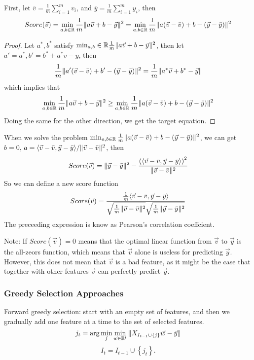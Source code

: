 First, let $ \bar v = \frac{1}{m} \sum^{m}_{i=1} v_i $, and $ \bar y = \frac{1}{m} \sum^{m}_{i=1} y_i $, then
\[
    Score(\vec{v}) = \min_{a, b \in \mathbb{R}} \frac{1}{m} \Arrowvert a \vec{v} + b - \vec{y} \Arrowvert^2 
    = \min_{a, b \in \mathbb{R}} \frac{1}{m} \Arrowvert a (\vec{v} - \bar v) + b - (\vec{y} - \bar y) \Arrowvert^2 
\]
\begin{proof}
    Let $ a^*, b^* $ satisfy $ \min_{a, b}\in\mathbb{R} \frac{1}{m} \Arrowvert a \vec{v} + b - \vec{y} \Arrowvert^2 $,
    then let $ a' = a^*, b' = b^* + a^* \bar v - \bar y $, then
    \[
        \frac{1}{m} \Arrowvert a'(\vec{v} - \bar v) + b' - (\vec{y} - \bar y) \Arrowvert^2 = \frac{1}{m} \Arrowvert a^* \vec{v} + b^* - \vec{y} \Arrowvert
    \]
    which implies that 
    \[
        \min_{a, b \in \mathbb{R}} \frac{1}{m} \Arrowvert a \vec{v} + b - \vec{y} \Arrowvert^2 
        \ge \min_{a, b \in \mathbb{R}} \frac{1}{m} \Arrowvert a (\vec{v} - \bar v) + b - (\vec{y} - \bar y) \Arrowvert^2 
    \]
    Doing the same for the other direction, we get the target equation.
\end{proof}
When we solve the problem $ \min_{a, b \in \mathbb{R}} \frac{1}{m} \Arrowvert a (\vec{v} - \bar v) + b - (\vec{y} - \bar y) \Arrowvert^2  $, we can get $ b = 0 $, $ a = \langle \vec{v} - \bar v, \vec{y} - \bar y \rangle/ \Arrowvert \vec{v} - \bar v \Arrowvert^2 $, then
\[
    Score(\vec{v}) = \Arrowvert \vec{y} - \bar y \Arrowvert^2 - \frac{{(\langle \vec{v} - \bar v, \vec{y} - \bar y \rangle)}^2}{ \Arrowvert \vec{v} - \bar v \Arrowvert^2} 
\]
So we can define a new score function
\[
    Score(\vec{v}) = \frac{\frac{1}{m} \langle \vec{v} - \bar v, \vec{y} - \bar y \rangle}{ \sqrt{\frac{1}{m} \Arrowvert \vec{v} - \bar v \Arrowvert^2} \sqrt{\frac{1}{m} \Arrowvert \vec{y} - \bar y \Arrowvert^2}} 
\]
The preceeding expression is know as {Pearson's correlation coeffcient}.

Note: If $ Score(\vec{v}) = 0 $ means that the optimal linear function from $ \vec{v} $ to $ \vec{y} $ is the {all-zeors} function, which means that $ \vec{v} $ alone is useless for predicting $ \vec{y} $. However, this does not mean that $ \vec{v} $ is a bad feature, as it might be the case that together with other features $ \vec{v} $ can perfectly predict $ \vec{y} $.

\subsubsection{Greedy Selection Approaches}%
Forward greedy selection: start with an empty set of features, and then we gradually add one feature at a time to the set of selected features.
\[
    j_t = \arg\min_j \min_{\vec{w} \in \mathbb{R}^t} \Arrowvert X_{I_{t-1} \cup \left\{ j \right\}} \vec{w} - \vec{y} \Arrowvert
\]
\[
    I_t = I_{t-1} \cup \left\{ j_t \right\}.
\]

